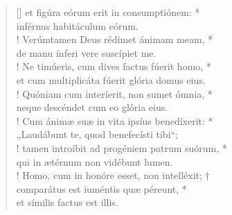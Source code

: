 \begin{verse}[\versewidth]
\vin et figúra eórum erit in consumptiónem: *\\
\vin inférnus habitáculum eórum.\\!
Verúmtamen Deus rédimet ánimam meam, *\\
de manu ínferi vere suscípiet me.\\!
\vin Ne timúeris, cum dives factus fúerit homo, *\\
\vin et cum multiplicáta fúerit glória domus eius.\\!
Quóniam cum interíerit, non sumet ómnia, *\\
neque descéndet cum eo glória eius.\\!
\vin Cum ánimæ suæ in vita ipsíus benedíxerit: *\\
\vin „Laudábunt te, quod benefecísti tibi“;\\!
tamen introíbit ad progéniem patrum suórum, *\\
qui in ætérnum non vidébunt lumen.\\!
\vin Homo, cum in honóre esset, non intelléxit; †\\
\vin comparátus est iuméntis quæ péreunt, *\\
\vin et símilis factus est illis.\\
\end{verse}
\vspace{1cm}



